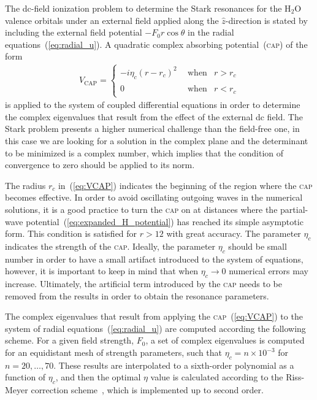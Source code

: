 
The dc-field ionization problem to determine the Stark resonances for
the H$_{2}$O valence orbitals under an external field applied along
the $\hat{z}$-direction is stated by including the external field
potential $-F_{0}r\cos\theta$ in the radial
equations~(\ref{eq:radial_u}). A quadratic complex absorbing
potential~(\textsc{cap}) of the form
%
\begin{eqnarray}
  V_{\mathrm{CAP}} = \left\{
  \begin{split}
    -i \eta_{c}(r - r_{c})^{2} \ & \mathrm{~when} & r > r_{c} \\
    0 \phantom{i \eta_{c}(r - r_{c})^{2}} \ & \mathrm{~when} &  r < r_{c}
  \end{split}
  \right.
\label{eq:VCAP}
\end{eqnarray}
%
is applied to the system of coupled differential equations in order to
determine the complex eigenvalues that result from the effect of the
external dc field. The Stark problem presents a higher numerical
challenge than the field-free one, in this case we are looking for a
solution in the complex plane and the determinant to be minimized is a
complex number, which implies that the condition of convergence to
zero should be applied to its norm.


The radius $r_{c}$ in~(\ref{eq:VCAP}) indicates the beginning of the
region where the \textsc{cap} becomes effective. In order to avoid
oscillating outgoing waves in the numerical solutions, it is a good
practice to turn the \textsc{cap} on at distances where the
partial-wave potential~(\ref{eq:expanded_H_potential}) has reached its
simple asymptotic form. This condition is satisfied for $r > 12$ with
great accuracy. The parameter $\eta_{c}$ indicates the strength of the
\textsc{cap}. Ideally, the parameter $\eta_{c}$ should be small number
in order to have a small artifact introduced to the system of
equations, however, it is important to keep in mind that when
$\eta_{c}\to 0$ numerical errors may increase. Ultimately, the
artificial term introduced by the \textsc{cap} needs to be removed
from the results in order to obtain the resonance parameters.

The complex eigenvalues that result from applying the
\textsc{cap}~(\ref{eq:VCAP}) to the system of radial
equations~(\ref{eq:radial_u}) are computed according the following
scheme. For a given field strength, $F_{0}$, a set of complex
eigenvalues is computed for an equidistant mesh of strength
parameters, such that $\eta_{c} = n \times 10^{-3}$ for $n = 20,
\dots, 70$. These results are interpolated to a sixth-order polynomial
as a function of $\eta_{c}$, and then the optimal $\eta$ value is
calculated according to the Riss-Meyer correction
scheme~\cite{RissMeyer_1993}, which is implemented up to second order.

